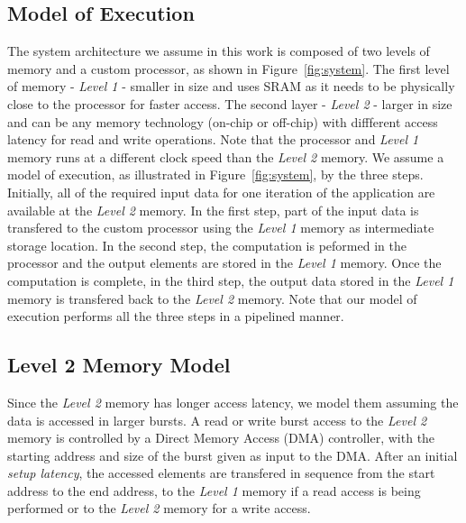 \subsection{Model of Execution}
\label{ssec:system_under_analysis}
The system architecture we assume in this work is composed of two levels of memory and a custom processor, as shown in Figure~\ref{fig:system}. The first level of memory - \textit{Level 1} - smaller in size and uses SRAM as it needs to be physically close to the processor for faster access. The second layer - \textit{Level 2} - larger in size and can be any memory technology (on-chip or off-chip) with diffferent access latency for read and write operations. Note that the processor and \textit{Level 1} memory runs at a different clock speed than the \textit{Level 2} memory. We assume a model of execution, as illustrated in Figure~\ref{fig:system}, by the three steps. Initially, all of the required input data for one iteration of the application are available at the \textit{Level 2} memory. In the first step, part of the input data is transfered to the custom processor using the \textit{Level 1} memory as intermediate storage location. In the second step, the computation is peformed in the processor and the output elements are stored in the \textit{Level 1} memory. Once the computation is complete, in the third step, the output data stored in the \textit{Level 1} memory is transfered back to the \textit{Level 2} memory. Note that our model of execution performs all the three steps in a pipelined manner.



\subsection{Level 2 Memory Model}
\label{ssec:layer2_model}
Since the \textit{Level 2} memory has longer access latency, we model them assuming the data is accessed in larger bursts.
A read or write burst access to the \textit{Level 2} memory is controlled by a Direct Memory Access (DMA) controller, with the starting address and size of the burst given as input to the DMA. After an initial \textit{setup latency}, the accessed elements are transfered in sequence from the start address to the end address, to the \textit{Level 1} memory if a read access is being performed or to the \textit{Level 2} memory for a write access.

